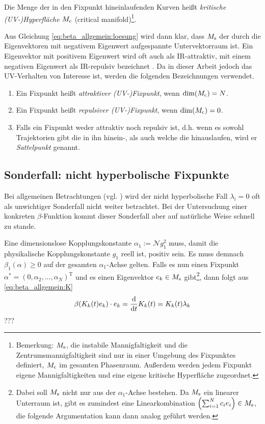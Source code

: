      \begin{definition}
      Die Menge der in den Fixpunkt hineinlaufenden Kurven heißt 
      \textit{kritische (UV-)Hyperfläche} $M_\text{c}$ (critical manifold)\footnote{Bemerkung: 
      $M_\text{s}$, die instabile Mannigfaltigkeit und die Zentrumsmannigfaltigkeit sind nur in einer 
      Umgebung des Fixpunktes 
      definiert, $M_\text{c}$ im gesamten Phasenraum. Außerdem werden jedem Fixpunkt eigene 
      Mannigfaltigkeiten und eine eigene kritische Hyperfläche zugeordnet.}. 
    \end{definition}
    Aus Gleichung \eqref{eq:beta_allgemein:loesung} wird dann klar, dass $M_\text{s}$ der durch die 
    Eigenvektoren mit negativem Eigenwert aufgespannte Untervektorraum ist. Ein Eigenvektor mit 
    positivem 
    Eigenwert wird oft auch als IR-attraktiv, mit einem negativen Eigenwert als IR-repulsiv 
    bezeichnet \cite{Weinberg:1976}. Da in dieser Arbeit jedoch das UV-Verhalten von Interesse 
    ist, werden die folgenden Bezeichnungen verwendet.
    \begin{enumerate}
     \item Ein Fixpunkt heißt \textit{attraktiver (UV-)Fixpunkt}, wenn $\dim(M_\text{c})=N$.
     \item Ein Fixpunkt heißt \textit{repulsiver (UV-)Fixpunkt}, wenn $\dim(M_\text{c})=0$.
     \item Falls ein Fixpunkt weder attraktiv noch repulsiv ist, d.h. wenn es sowohl 
     Trajektorien gibt die in ihn hinein-, als auch welche die hinauslaufen, wird er 
     \textit{Sattelpunkt} genannt.
    \end{enumerate}

  \subsection{Sonderfall: nicht hyperbolische Fixpunkte}
    Bei allgemeinen Betrachtungen (vgl. \cite{Weinberg:1976}) 
    wird der nicht hyperbolische Fall $\lambda_i = 0$ oft als unwichtiger Sonderfall nicht 
    weiter betrachtet. Bei der Untersuchung einer konkreten $\beta$-Funktion kommt dieser 
    Sonderfall aber auf natürliche Weise schnell zu stande.
    
    Eine dimensionslose Kopplungskonstante $\alpha_1:=\mathcal{N}g_1^2$ muss, damit die 
    physikalische Kopplungskonstante $g_1$ reell ist, positiv sein. Es muss demnach 
    $\beta_1(\alpha)\geq 0$ auf der gesamten $\alpha_1$-Achse gelten. Falls es nun einen 
    Fixpunkt $\alpha^*=(0,\alpha_2,\ldots,\alpha_N)^\text{T}$ und es einen Eigenvektor
    $e_k\in M_\text{s}$ gibt\footnote{Dabei 
    soll $M_\text{s}$ nicht nur aus der $\alpha_1$-Achse bestehen. Da $M_\text{s}$ ein linearer Unterraum 
    ist, gibt es zumindest eine Linearkombination $\left(\sum_{i=1}^N c_ie_i\right)\in M_\text{s}$, 
    die folgende Argumentation kann dann analog geführt werden.},
    dann folgt aus \eqref{eq:beta_allgemein:K}
    \begin{equation}
     \beta(K_k(t)e_k)\cdot e_k = \frac{\text{d}}{\text{d} t} K_k(t) = K_k(t) \lambda_k
    \end{equation}
    ???
    
